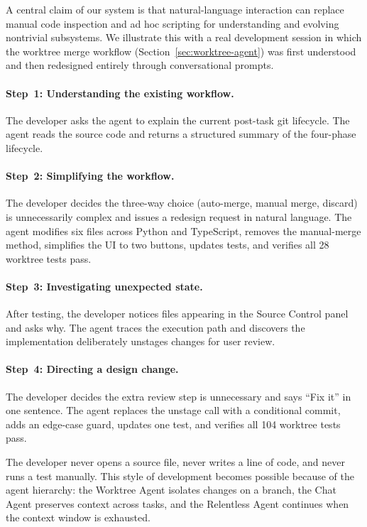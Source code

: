 \documentclass{article}
\begin{document}
A central claim of our system is that natural-language interaction can replace manual code inspection and ad hoc scripting for understanding and evolving nontrivial subsystems.  We illustrate this with a real development session in which the worktree merge workflow (Section~\ref{sec:worktree-agent}) was first understood and then redesigned entirely through conversational prompts.

\paragraph{Step~1: Understanding the existing workflow.} The developer asks the agent to explain the current post-task git lifecycle.  The agent reads the source code and returns a structured summary of the four-phase lifecycle.

\paragraph{Step~2: Simplifying the workflow.} The developer decides the three-way choice (auto-merge, manual merge, discard) is unnecessarily complex and issues a redesign request in natural language.  The agent modifies six files across Python and TypeScript, removes the manual-merge method, simplifies the UI to two buttons, updates tests, and verifies all 28 worktree tests pass.

\paragraph{Step~3: Investigating unexpected state.} After testing, the developer notices files appearing in the Source Control panel and asks why.  The agent traces the execution path and discovers the implementation deliberately unstages changes for user review.

\paragraph{Step~4: Directing a design change.} The developer decides the extra review step is unnecessary and says ``Fix it'' in one sentence.  The agent replaces the unstage call with a conditional commit, adds an edge-case guard, updates one test, and verifies all 104 worktree tests pass.

The developer never opens a source file, never writes a line of code, and never runs a test manually.  This style of development becomes possible because of the agent hierarchy: the Worktree Agent isolates changes on a branch, the Chat Agent preserves context across tasks, and the Relentless Agent continues when the context window is exhausted.
\end{document}
